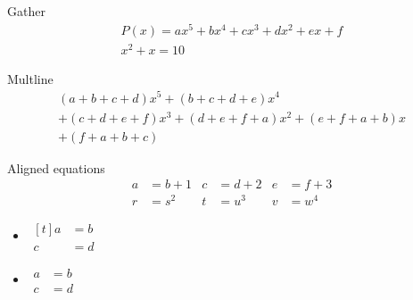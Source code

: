 \documentclass[a4paper]{article}
\begin{document}
Gather
\begin{gather}
P(x)=ax^{5}+bx^{4}+cx^{3}+dx^{2}+ex +f\\
x^2+x=10
\end{gather}

Multline
\begin{multline*}
(a+b+c+d)x^{5}+(b+c+d+e)x^{4} \\
+(c+d+e+f)x^{3}+(d+e+f+a)x^{2}+(e+f+a+b)x\\
+ (f+a+b+c)
\end{multline*}

Aligned equations
\begin{align*}
a &= b+1 & c &= d+2 & e &= f+3 \\
r &= s^{2} & t &=u^{3} & v &= w^{4}
\end{align*}

\begin{itemize}
\item
$\begin{aligned}[t]
a&=b\\
c&=d
\end{aligned}$
\item
$\begin{aligned}
a&=b\\
c&=d
\end{aligned}$
\end{itemize}
\end{document}
